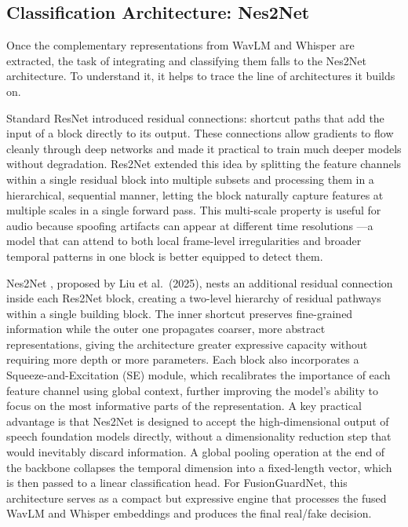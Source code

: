 \documentclass[11pt,a4paper]{article}
\begin{document}
\subsection{Classification Architecture: Nes2Net}

Once the complementary representations from WavLM and Whisper are extracted, the
task of integrating and classifying them falls to the Nes2Net architecture. To
understand it, it helps to trace the line of architectures it builds on.

Standard ResNet \cite{he2016resnet} introduced residual connections: shortcut
paths that add the input of a block directly to its output. These connections
allow gradients to flow cleanly through deep networks and made it practical to
train much deeper models without degradation. Res2Net \cite{gao2021res2net}
extended this idea by splitting the feature channels within a single residual
block into multiple subsets and processing them in a hierarchical, sequential
manner, letting the block naturally capture features at multiple scales in a
single forward pass. This multi-scale property is useful for audio because
spoofing artifacts can appear at different time resolutions
\cite{li2021res2net,fan2023res2net}---a model that can attend to both local
frame-level irregularities and broader temporal patterns in one block is better
equipped to detect them.

Nes2Net \cite{liu2025nes2net}, proposed by Liu et al.\ (2025), nests an
additional residual connection inside each Res2Net block, creating a two-level
hierarchy of residual pathways within a single building block. The inner shortcut
preserves fine-grained information while the outer one propagates coarser, more
abstract representations, giving the architecture greater expressive capacity
without requiring more depth or more parameters. Each block also incorporates a
Squeeze-and-Excitation (SE) module, which recalibrates the importance of each
feature channel using global context, further improving the model's ability to
focus on the most informative parts of the representation. A key practical
advantage is that Nes2Net is designed to accept the high-dimensional output of
speech foundation models directly, without a dimensionality reduction step that
would inevitably discard information. A global pooling operation at the end of the
backbone collapses the temporal dimension into a fixed-length vector, which is
then passed to a linear classification head. For FusionGuardNet, this architecture
serves as a compact but expressive engine that processes the fused WavLM and
Whisper embeddings and produces the final real/fake decision.
\end{document}

